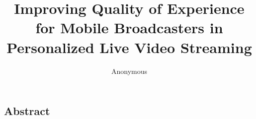 \documentclass[conference]{IEEEtran}
\begin{document}


\title{Improving Quality of Experience for Mobile Broadcasters in Personalized Live Video Streaming}

\author{Anonymous}

\maketitle


\subsection*{Abstract}




%










\begin{small}

\end{small}
\label{last-page}
\end{document}
